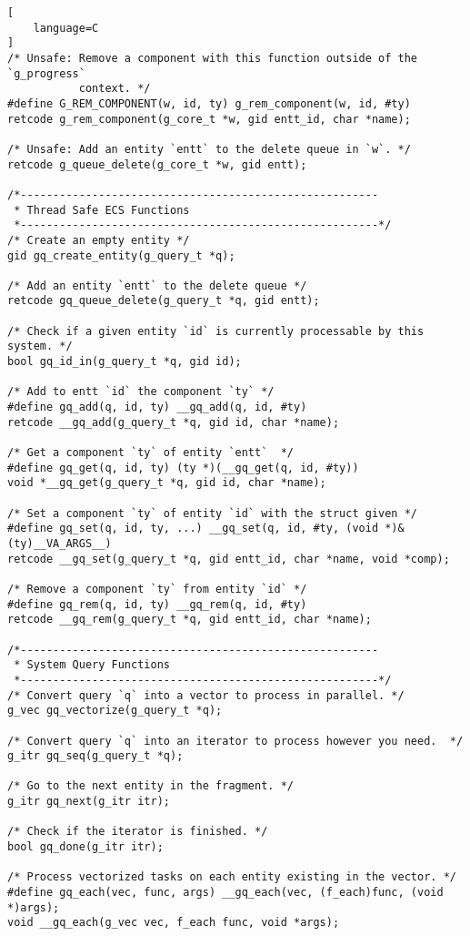 \begin{lstlisting}[
    language=C
]
/* Unsafe: Remove a component with this function outside of the `g_progress`
           context. */
#define G_REM_COMPONENT(w, id, ty) g_rem_component(w, id, #ty)
retcode g_rem_component(g_core_t *w, gid entt_id, char *name);

/* Unsafe: Add an entity `entt` to the delete queue in `w`. */
retcode g_queue_delete(g_core_t *w, gid entt);

/*-------------------------------------------------------
 * Thread Safe ECS Functions
 *-------------------------------------------------------*/
/* Create an empty entity */
gid gq_create_entity(g_query_t *q);

/* Add an entity `entt` to the delete queue */
retcode gq_queue_delete(g_query_t *q, gid entt);

/* Check if a given entity `id` is currently processable by this system. */
bool gq_id_in(g_query_t *q, gid id);

/* Add to entt `id` the component `ty` */
#define gq_add(q, id, ty) __gq_add(q, id, #ty)
retcode __gq_add(g_query_t *q, gid id, char *name);

/* Get a component `ty` of entity `entt`  */
#define gq_get(q, id, ty) (ty *)(__gq_get(q, id, #ty))
void *__gq_get(g_query_t *q, gid id, char *name);

/* Set a component `ty` of entity `id` with the struct given */
#define gq_set(q, id, ty, ...) __gq_set(q, id, #ty, (void *)&(ty)__VA_ARGS__)
retcode __gq_set(g_query_t *q, gid entt_id, char *name, void *comp);

/* Remove a component `ty` from entity `id` */
#define gq_rem(q, id, ty) __gq_rem(q, id, #ty)
retcode __gq_rem(g_query_t *q, gid entt_id, char *name);

/*-------------------------------------------------------
 * System Query Functions
 *-------------------------------------------------------*/
/* Convert query `q` into a vector to process in parallel. */
g_vec gq_vectorize(g_query_t *q);

/* Convert query `q` into an iterator to process however you need.  */
g_itr gq_seq(g_query_t *q);

/* Go to the next entity in the fragment. */
g_itr gq_next(g_itr itr);

/* Check if the iterator is finished. */
bool gq_done(g_itr itr);

/* Process vectorized tasks on each entity existing in the vector. */
#define gq_each(vec, func, args) __gq_each(vec, (f_each)func, (void *)args);
void __gq_each(g_vec vec, f_each func, void *args);


\end{lstlisting}
